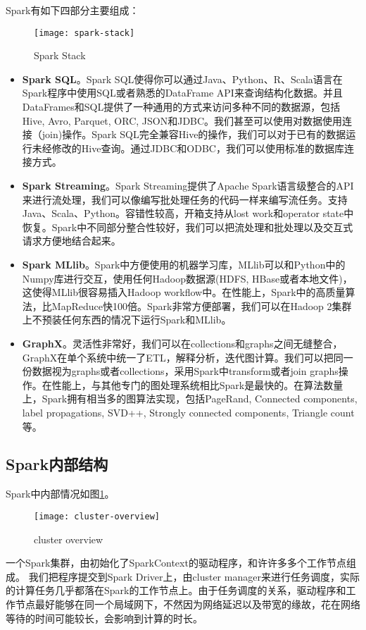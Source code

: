 Spark有如下四部分主要组成：
\begin{figure}[ht]
\centering
\texttt{[image: spark-stack]}
\caption{Spark Stack}
\end{figure}
\begin{itemize}
    \item \textbf{Spark SQL}。Spark SQL使得你可以通过Java、Python、R、Scala语言在Spark程序中使用SQL或者熟悉的DataFrame API来查询结构化数据。并且DataFrames和SQL提供了一种通用的方式来访问多种不同的数据源，包括Hive, Avro, Parquet, ORC, JSON和JDBC。我们甚至可以使用对数据使用连接（join)操作。Spark SQL完全兼容Hive的操作，我们可以对于已有的数据运行未经修改的Hive查询。通过JDBC和ODBC，我们可以使用标准的数据库连接方式。
    \item \textbf{Spark Streaming}。Spark Streaming提供了Apache Spark语言级整合的API来进行流处理，我们可以像编写批处理任务的代码一样来编写流任务。支持Java、Scala、Python。容错性较高，开箱支持从lost work和operator state中恢复。Spark中不同部分整合性较好，我们可以把流处理和批处理以及交互式请求方便地结合起来。
    \item \textbf{Spark MLlib}。Spark中方便使用的机器学习库，MLlib可以和Python中的Numpy库进行交互，使用任何Hadoop数据源(HDFS, HBase或者本地文件)，这使得MLlib很容易插入Hadoop workflow中。在性能上，Spark中的高质量算法，比MapReduce快100倍。Spark非常方便部署，我们可以在Hadoop 2集群上不预装任何东西的情况下运行Spark和MLlib。
    \item \textbf{GraphX}。灵活性非常好，我们可以在collections和graphs之间无缝整合，GraphX在单个系统中统一了ETL，解释分析，迭代图计算。我们可以把同一份数据视为graphs或者collections，采用Spark中transform或者join graphs操作。在性能上，与其他专门的图处理系统相比Spark是最快的。在算法数量上，Spark拥有相当多的图算法实现，包括PageRand, Connected components, label propagations, SVD++, Strongly connected components, Triangle count等。
\end{itemize}

\subsection{Spark内部结构}
Spark中内部情况如图\ref{fig:clusterOverview}。
\begin{figure}[ht]
\centering
\texttt{[image: cluster-overview]}
\caption{cluster overview}\label{fig:clusterOverview}
\end{figure}
一个Spark集群，由初始化了SparkContext的驱动程序，和许许多多个工作节点组成。
我们把程序提交到Spark Driver上，由cluster manager来进行任务调度，实际的计算任务几乎都落在Spark的工作节点上。由于任务调度的关系，驱动程序和工作节点最好能够在同一个局域网下，不然因为网络延迟以及带宽的缘故，花在网络等待的时间可能较长，会影响到计算的时长。
